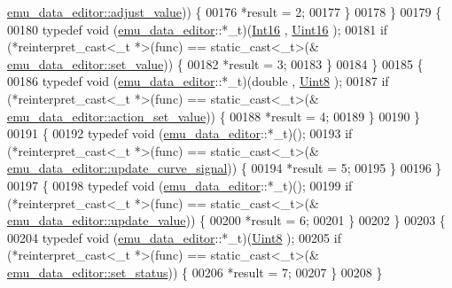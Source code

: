 \begin{DoxyCode}
      \hyperlink{a00008_a74d292de22b341313df1852cb1033704}{emu\_data\_editor::adjust\_value})) \{
00176                 *result = 2;
00177             \}
00178         \}
00179         \{
00180             \textcolor{keyword}{typedef} void (\hyperlink{a00008}{emu\_data\_editor}::*\_t)(\hyperlink{a00004_a3985266aecb120f269789241c170850c}{Int16} , 
      \hyperlink{a00004_aae7407b021d43f7193a81a58cfb3e297}{Uint16} );
00181             \textcolor{keywordflow}{if} (*reinterpret\_cast<\_t *>(func) == \textcolor{keyword}{static\_cast<}\_t\textcolor{keyword}{>}(&
      \hyperlink{a00008_a9d26460f253a29dd961b20be0afb5358}{emu\_data\_editor::set\_value})) \{
00182                 *result = 3;
00183             \}
00184         \}
00185         \{
00186             \textcolor{keyword}{typedef} void (\hyperlink{a00008}{emu\_data\_editor}::*\_t)(double , \hyperlink{a00004_a979e3e23b9a449e69ab6a8a83b6042f8}{Uint8} );
00187             \textcolor{keywordflow}{if} (*reinterpret\_cast<\_t *>(func) == \textcolor{keyword}{static\_cast<}\_t\textcolor{keyword}{>}(&
      \hyperlink{a00008_a7c1fa0d7d1623b11d4badceb1854010e}{emu\_data\_editor::action\_set\_value})) \{
00188                 *result = 4;
00189             \}
00190         \}
00191         \{
00192             \textcolor{keyword}{typedef} void (\hyperlink{a00008}{emu\_data\_editor}::*\_t)();
00193             \textcolor{keywordflow}{if} (*reinterpret\_cast<\_t *>(func) == \textcolor{keyword}{static\_cast<}\_t\textcolor{keyword}{>}(&
      \hyperlink{a00008_a7dfbddd62d6782b0f0ce809cbf2338ba}{emu\_data\_editor::update\_curve\_signal})) \{
00194                 *result = 5;
00195             \}
00196         \}
00197         \{
00198             \textcolor{keyword}{typedef} void (\hyperlink{a00008}{emu\_data\_editor}::*\_t)();
00199             \textcolor{keywordflow}{if} (*reinterpret\_cast<\_t *>(func) == \textcolor{keyword}{static\_cast<}\_t\textcolor{keyword}{>}(&
      \hyperlink{a00008_ad5f20fdbb4731185020ff4e90cd1ead2}{emu\_data\_editor::update\_value})) \{
00200                 *result = 6;
00201             \}
00202         \}
00203         \{
00204             \textcolor{keyword}{typedef} void (\hyperlink{a00008}{emu\_data\_editor}::*\_t)(\hyperlink{a00004_a979e3e23b9a449e69ab6a8a83b6042f8}{Uint8} );
00205             \textcolor{keywordflow}{if} (*reinterpret\_cast<\_t *>(func) == \textcolor{keyword}{static\_cast<}\_t\textcolor{keyword}{>}(&
      \hyperlink{a00008_a9476424a86a6ed4f84c64d0ac77143cc}{emu\_data\_editor::set\_status})) \{
00206                 *result = 7;
00207             \}
00208         \}

\end{DoxyCode}

